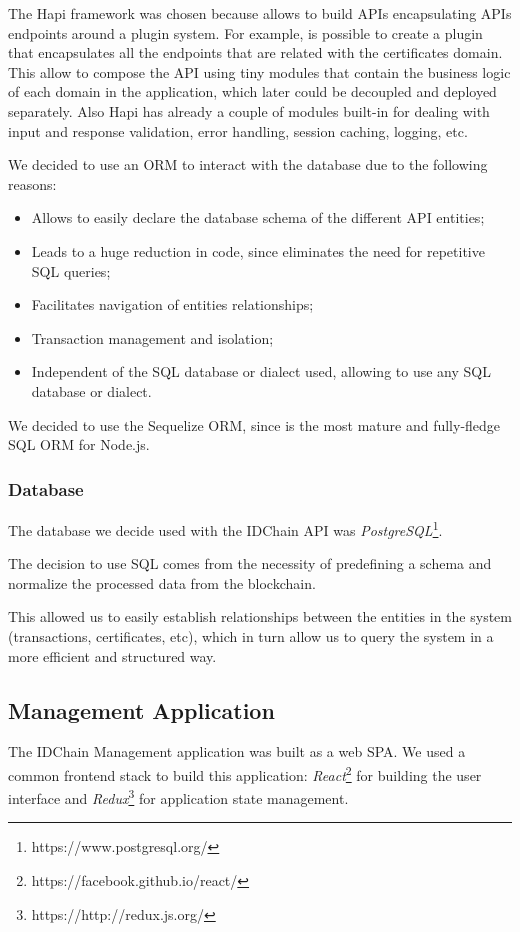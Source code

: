 The Hapi framework was chosen because allows to build APIs encapsulating APIs endpoints around a plugin system. For example, is possible to create a plugin that encapsulates all the endpoints that are related with the certificates domain.
This allow to compose the API using tiny modules that contain the business logic of each domain in the application, which later could be decoupled and deployed separately.
Also Hapi has already a couple of modules built-in for dealing with input and response validation, error handling, session caching, logging, etc.

We decided to use an \ac{ORM} to interact with the database due to the following reasons:

\begin{itemize}
  \item Allows to easily declare the database schema of the different API entities;
  \item Leads to a huge reduction in code, since eliminates the need for repetitive SQL queries;
  \item Facilitates navigation of entities relationships;
  \item Transaction management and isolation;
  \item Independent of the SQL database or dialect used, allowing to use any SQL database or dialect.
\end{itemize}

We decided to use the Sequelize ORM, since is the most mature and fully-fledge SQL ORM for Node.js.

\subsubsection{Database}

The database we decide used with the IDChain API was \textit{PostgreSQL}\footnote{https://www.postgresql.org/}.

The decision to use SQL comes from the necessity of predefining a schema and normalize the processed data from the blockchain.

This allowed us to easily establish relationships between the entities in the system (transactions, certificates, etc), which in turn allow us to query the system in a more efficient and structured way.

\subsection{Management Application}
The IDChain Management application was built as a web \ac{SPA}.
We used a common frontend stack to build this application: \textit{React}\footnote{https://facebook.github.io/react/} for building the user interface and \textit{Redux}\footnote{https://http://redux.js.org/} for application state management.

